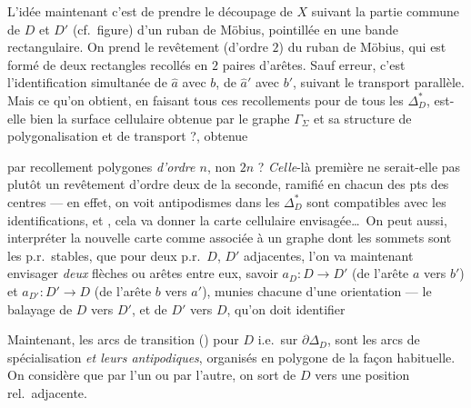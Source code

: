 \documentclass[11pt,a4paper]{article}
\begin{document}
L'idée maintenant c'est de prendre le découpage de $X$ suivant la partie commune de $D$ et $D'$ (cf.\ figure)  d'un ruban de Möbius, \struck{\ill{} \ill{}}  pointillée en une bande rectangulaire. On prend le revêtement   (d'ordre $2$) du ruban de Möbius, qui est formé de deux rectangles recollés en $2$ paires d'arêtes. Sauf erreur, c'est l'identification \struck{\ill{}} simultanée de $\hat{a}$ avec $b$, \struck{\ill{}} de $\hat{a}'$ avec $b'$, suivant le transport parallèle. Mais ce qu'on obtient, en faisant tous ces recollements pour  de tous les $\Delta^{\ast}_D$, est-elle bien la surface cellulaire obtenue par le graphe $\Gamma_{\Sigma}$ et sa structure de polygonalisation et de transport ?, obtenue

par recollement  polygones \emph{d'ordre $n$}, non $2n$ ? \emph{Celle}-là première ne serait-elle pas plutôt un revêtement d'ordre deux de la seconde, ramifié en chacun des pts des centres --- en effet, on voit \struck{\ill{}}  antipodismes dans les $\Delta^{\ast}_D$ sont compatibles avec les identifications, et , cela va donner  la carte cellulaire envisagée\ldots\ On peut aussi, \struck{\ill{}}  \struck{\ill{}} interpréter la nouvelle carte comme associée à un graphe  dont les sommets sont les p.r.\ stables, que pour deux p.r.\ $D$, $D'$ adjacentes, l'on va maintenant envisager \emph{deux} flèches ou arêtes entre eux, savoir $a_D : D \to D'$ (de l'arête $a$ vers $b'$) et $a_{D'} : D' \to D$ (de l'arête $b$ vers $a'$), munies chacune d'une orientation --- le balayage de $D$ vers $D'$, et de $D'$ vers $D$, qu'on doit identifier

Maintenant, les arcs de transition () pour $D$ i.e.\ sur $\partial\Delta_D$, sont les arcs de spécialisation \emph{et leurs antipodiques}, organisés en polygone de la façon habituelle. On considère que par l'un ou par l'autre, on sort de $D$  vers une position rel.\ adjacente.
\end{document}
